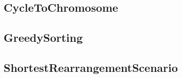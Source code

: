 \subsection{CycleToChromosome}


\subsection{GreedySorting}


\subsection{ShortestRearrangementScenario}


\fi 